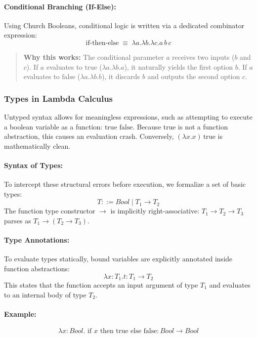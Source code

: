 \documentclass{article}
\begin{document}
\paragraph{Conditional Branching (If-Else):} Using Church Booleans, conditional logic is written via a dedicated combinator expression:
\[
\text{if-then-else} \;\equiv\; \lambda a . \lambda b . \lambda c . a \, b \, c
\]
\begin{quote}
\textbf{Why this works:} The conditional parameter $a$ receives two inputs ($b$ and $c$). If $a$ evaluates to $\text{true}$ ($\lambda a. \lambda b. a$), it naturally yields the first option $b$. If $a$ evaluates to $\text{false}$ ($\lambda a. \lambda b. b$), it discards $b$ and outputs the second option $c$.
\end{quote}

\subsubsection{Types in Lambda Calculus}
Untyped syntax allows for meaningless expressions, such as attempting to execute a boolean variable as a function: $\text{true } \text{false}$. Because $\text{true}$ is not a function abstraction, this causes an evaluation crash. Conversely, $(\lambda x . x) \, \text{true}$ is mathematically clean.

\paragraph{Syntax of Types:}
To intercept these structural errors before execution, we formalize a set of basic types:
\[
T ::= Bool \mid T_1 \to T_2
\]
The function type constructor $\to$ is implicitly right-associative: $T_1 \to T_2 \to T_3$ parses as $T_1 \to (T_2 \to T_3)$.

\paragraph{Type Annotations:} 
To evaluate types statically, bound variables are explicitly annotated inside function abstractions:
\[
\lambda x : T_1 . t : T_1 \to T_2
\]
This states that the function accepts an input argument of type $T_1$ and evaluates to an internal body of type $T_2$.

\paragraph{Example:}
\[
\lambda x : Bool . \text{ if } x \text{ then true else false} : Bool \to Bool
\]
\end{document}

